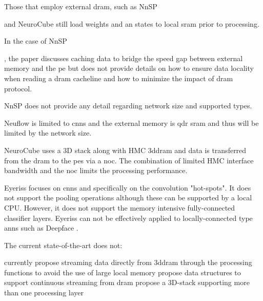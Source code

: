 Those that employ external \ac{dram}, such as NnSP{\cite{esmaeilzadeh2005nnsp} and NeuroCube\cite{kim2016neurocube} still 
load weights and \ac{an} states to local \ac{sram} prior to processing.

In the case of NnSP{\cite{esmaeilzadeh2005nnsp}, the paper discusses caching data to bridge the speed gap between external memory and the \ac{pe} 
but does not provide details on how to ensure data locality when reading a \ac{dram} cacheline and how to minimize the impact of \ac{dram} protocol.

NnSP does not provide any detail regarding network size and supported types.

Neuflow\cite{farabet2011neuflow} is limited to \acp{cnn} and the external memory is \ac{qdr} \ac{sram} 
and thus will be limited by the network size.

NeuroCube uses a 3D stack along with HMC \ac{3ddram} and data is transferred from the \ac{dram} to the \acp{pe} via a \ac{noc}.
The combination of limited HMC interface bandwidth and the \ac{noc} limits the processing performance.

Eyeriss\cite{chen201614} focuses on \acp{cnn} and specifically on the convolution "hot-spots". It does not support the pooling operations although these can
be supported by a local CPU.  However, it does not support the memory intensive fully-connected classifier layers. 
Eyeriss can not be effectively applied to locally-connected type \acp{ann} such as Deepface \cite{Taigman_2014_CVPR}.

\iffalse
Unlike the current state-of-the-art, this work focuses on processing data as it read out of the \ac{dram} thus avoiding requiring excessive \ac{sram}.
in the \acp{pe} thus allowing optimum logic assignment to the processing functions.
\fi

\iftrue
The current state-of-the-art does not:
\begin{outline}
  \1 currently propose streaming data directly from \ac{3ddram} through the processing functions to avoid the use of large local memory
  \1 propose data structures to support continuous streaming from \ac{dram}
  \1 propose a 3D-stack supporting more than one processing layer
\end{outline}
\fi

}}
